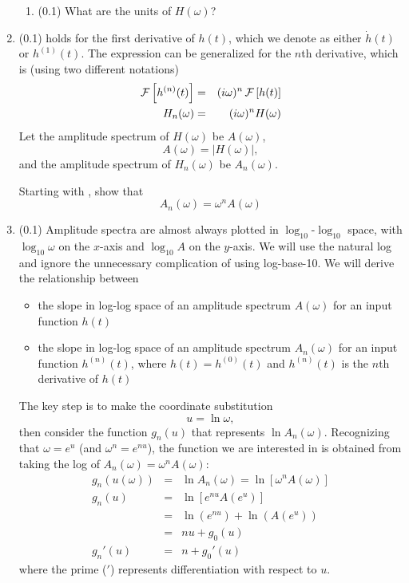 \documentclass[11pt,titlepage,fleqn]{article}
\newcommand{\fft}{h}
\newcommand{\ffw}{H}
\begin{document}
\begin{enumerate}
\begin{enumerate}
\item (0.1) What are the units of $\ffw(\omega)$?
\end{enumerate}


\item (0.1)  holds for the first derivative of $\fft(t)$, which we denote as either $\dot{\fft}(t)$ or $\fft^{(1)}(t)$. The expression can be generalized for the $n$th derivative, which is (using two different notations)
%
\begin{eqnarray}
\cF \left[ \fft^{(n)}(t) \right] &=& (i\omega)^n \, \cF \left[ \fft(t) \right]
\\
\ffw_n(\omega) &=& (i\omega)^n \ffw(\omega)
\label{fftnder}
\end{eqnarray}
%
Let the amplitude spectrum of $\ffw(\omega)$ be $A(\omega)$,
%
\begin{equation}
A(\omega) = |\ffw(\omega)|,
\end{equation}
%
and the amplitude spectrum of $\ffw_n(\omega)$ be $A_n(\omega)$.

Starting with , show that
%
\begin{equation}
A_n(\omega) = \omega^n A(\omega)
\end{equation}


\item (0.1) Amplitude spectra are almost always plotted in $\log_{10}$-$\log_{10}$ space, with $\log_{10}\omega$ on the $x$-axis and $\log_{10}A$ on the $y$-axis. We will use the natural log and ignore the unnecessary complication of using log-base-10. We will derive the relationship between
%
\begin{itemize}
\item the slope in log-log space of an amplitude spectrum $A(\omega)$ for an input function $\fft(t)$
\item the slope in log-log space of an amplitude spectrum $A_n(\omega)$ for an input function $h^{(n)}(t)$, where $h(t) = h^{(0)}(t)$ and $h^{(n)}(t)$ is the $n$th derivative of $h(t)$
\end{itemize}

The key step is to make the coordinate substitution
%
\begin{equation}
u = \ln\omega,
\end{equation}
%
then consider the function $g_n(u)$ that represents $\ln A_n(\omega)$. Recognizing that $\omega = e^u$ (and $\omega^n = e^{nu}$), the function we are interested in is obtained from taking the log of \mbox{$A_n(\omega) = \omega^n A(\omega)$}:
%
\begin{eqnarray}
g_n(u(\omega)) &=& \ln A_n(\omega) = \ln[ \omega^n A(\omega)]
\\
g_n(u) &=& \ln[ e^{nu} A(e^u) ]
\\
&=& \ln(e^{nu}) + \ln(A(e^u))
\\
&=& nu + g_0(u)
\\
g_n'(u) &=& n + g_0'(u)
\label{Anslope}
\end{eqnarray}
%
where the prime ($'$) represents differentiation with respect to $u$.


\end{enumerate}
\end{document}
